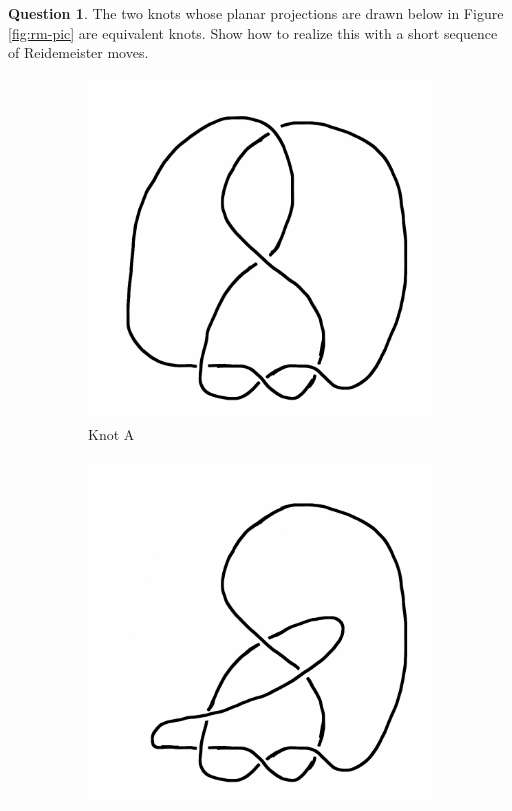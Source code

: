 \documentclass[12pt,letterpaper]{article}
\theoremstyle{definition}
\newtheorem{question}{Question}
\begin{document}
\begin{question}
The two knots whose planar projections are drawn below in Figure \ref{fig:rm-pic} are equivalent knots. Show how to realize this with a short sequence of Reidemeister moves.
\begin{figure}[h!]
    \centering
    \begin{subfigure}{.3\textwidth}
        \centering
        \includegraphics[width=\textwidth]{knotpics/exercise2-1.png}
        \caption{Knot A}
    \end{subfigure}
    \hspace{1cm}
    \begin{subfigure}{.3\textwidth}
        \centering
        \includegraphics[width=\textwidth]{knotpics/exercise2-2.png}

\end{subfigure}
\end{figure}
\end{question}
\end{document}
